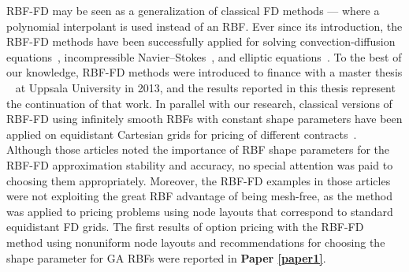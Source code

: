 \documentclass{UUThesisTemplate}
\begin{document}
\par
RBF-FD may be seen as a generalization of classical FD methods --- where a polynomial interpolant is used instead of an RBF. Ever since its introduction, the RBF-FD methods have been successfully applied for solving convection-diffusion equations~\cite{chandhini2007local, stevens2009use}, incompressible Navier--Stokes~\cite{shu2003local, shan2008application, chinchapatnam2009compact}, and elliptic equations~\cite{tolstykh2003using, wright2006scattered}. To the best of our knowledge, RBF-FD methods were introduced to finance with a master thesis ~\cite{wang2013radial} at Uppsala University in 2013, and the results reported in this thesis represent the continuation of that work. In parallel with our research, classical versions of RBF-FD using infinitely smooth RBFs with constant shape parameters have been applied on equidistant Cartesian grids for pricing of different contracts~\cite{kadalbajoo2013application, kadalbajoo2015application, kumar2015numerical, kadalbajoo2017radial}. Although those articles noted the importance of RBF shape parameters for the RBF-FD approximation stability and accuracy, no special attention was paid to choosing them appropriately. Moreover, the RBF-FD examples in those articles were not exploiting the great RBF advantage of being mesh-free, as the method was applied to pricing problems using node layouts that correspond to standard equidistant FD grids. The first results of option pricing with the RBF-FD method using nonuniform node layouts and recommendations for choosing the shape parameter for GA RBFs were reported in \textbf{Paper \ref{paper1}}.
%
\end{document}
